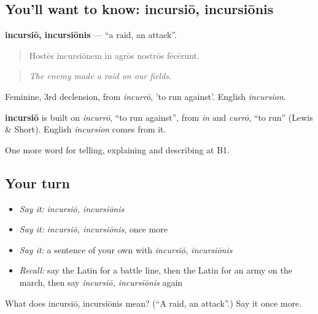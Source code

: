 \subsection*{You'll want to know: incursiō, incursiōnis}
\textbf{incursiō, incursiōnis} — \textquotedblleft{}a raid, an attack\textquotedblright{}.

\begin{quote}
Hostēs incursiōnem in agrōs nostrōs fēcērunt.
\end{quote}

\begin{quote}
\emph{The enemy made a raid on our fields.}
\end{quote}

Feminine, 3rd declension, from \emph{incurrō}, 'to run against'. English \emph{incursion}.

\begin{cousinweb}
\textbf{incursiō} is built on \emph{incurrō}, \textquotedblleft{}to run against\textquotedblright{}, from \emph{in} and \emph{currō}, \textquotedblleft{}to run\textquotedblright{} (Lewis \& Short). English \emph{incursion} comes from it.
\end{cousinweb}

\begin{grammarlens}[title={What you've built}]
One more word for telling, explaining and describing at B1.
\end{grammarlens}

\subsection*{Your turn}
\begin{itemize}
\raggedright
  \item \emph{Say it:} \emph{incursiō, incursiōnis}
  \item \emph{Say it:} \emph{incursiō, incursiōnis}, once more
  \item \emph{Say it:} a sentence of your own with \emph{incursiō, incursiōnis}
  \item \emph{Recall:} say the Latin for a battle line, then the Latin for an army on the march, then say \emph{incursiō, incursiōnis} again
\end{itemize}

\begin{tcolorbox}[breakable,colback=teal!4,colframe=teal!35!black,title={Before you move on}]
What does incursiō, incursiōnis mean? (\textquotedblleft{}A raid, an attack\textquotedblright{}.) Say it once more.
\end{tcolorbox}
